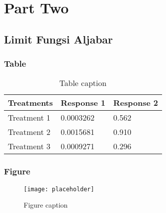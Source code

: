 \documentclass[11pt,fleqn]{book} %
\begin{document}

\part{Part Two}



\chapter{Limit Fungsi Aljabar}

\section{Table}

\begin{table}[h]
\centering
\begin{tabular}{l l l}
\toprule
\textbf{Treatments} & \textbf{Response 1} & \textbf{Response 2}\\
\midrule
Treatment 1 & 0.0003262 & 0.562 \\
Treatment 2 & 0.0015681 & 0.910 \\
Treatment 3 & 0.0009271 & 0.296 \\
\bottomrule
\end{tabular}
\caption{Table caption}
\end{table}


\section{Figure}

\begin{figure}[h]
\centering\texttt{[image: placeholder]}
\caption{Figure caption}
\end{figure}

\end{document}
